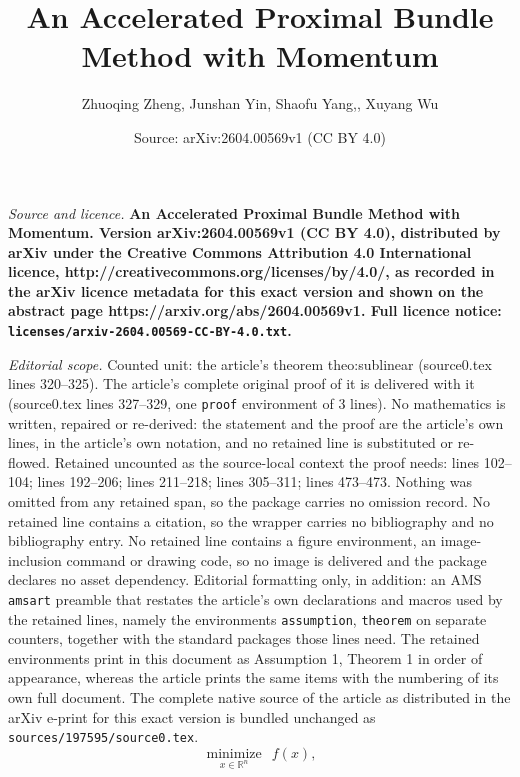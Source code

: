 \documentclass[10pt,a4paper]{amsart}
\title{\LARGE \bf An Accelerated Proximal Bundle Method with Momentum}
\author{Zhuoqing Zheng, Junshan Yin, Shaofu Yang,, Xuyang Wu}
\date{Source: arXiv:2604.00569v1 (CC BY 4.0)}
\begin{document}
\maketitle

\noindent\emph{Source and licence.} \LARGE \bf An Accelerated Proximal Bundle Method with Momentum. Version arXiv:2604.00569v1 (CC BY 4.0), distributed by arXiv under the Creative Commons Attribution 4.0 International licence, http://creativecommons.org/licenses/by/4.0/, as recorded in the arXiv licence metadata for this exact version and shown on the abstract page https://arxiv.org/abs/2604.00569v1. Full licence notice: \texttt{licenses/arxiv-2604.00569-CC-BY-4.0.txt}.\par\smallskip

\noindent\textit{Editorial scope.} Counted unit: the article's theorem theo:sublinear (source0.tex lines 320--325). The article's complete original proof of it is delivered with it (source0.tex lines 327--329, one \texttt{proof} environment of 3 lines). No mathematics is written, repaired or re-derived: the statement and the proof are the article's own lines, in the article's own notation, and no retained line is substituted or re-flowed.  Retained uncounted as the source-local context the proof needs: lines 102--104; lines 192--206; lines 211--218; lines 305--311; lines 473--473.  Nothing was omitted from any retained span, so the package carries no omission record.  No retained line contains a citation, so the wrapper carries no bibliography and no bibliography entry.  No retained line contains a figure environment, an image-inclusion command or drawing code, so no image is delivered and the package declares no asset dependency.  Editorial formatting only, in addition: an AMS \texttt{amsart} preamble that restates the article's own declarations and macros used by the retained lines, namely the environments \texttt{assumption}, \texttt{theorem} on separate counters, together with the standard packages those lines need.  The retained environments print in this document as Assumption 1, Theorem 1 in order of appearance, whereas the article prints the same items with the numbering of its own full document.  The complete native source of the article as distributed in the arXiv e-print for this exact version is bundled unchanged as \texttt{sources/197595/source0.tex}.
\begin{equation}\label{problem}
       \underset{x \in \mathbb{R}^n}{\operatorname{minimize}} ~~ f(x),
\end{equation}
\end{document}
